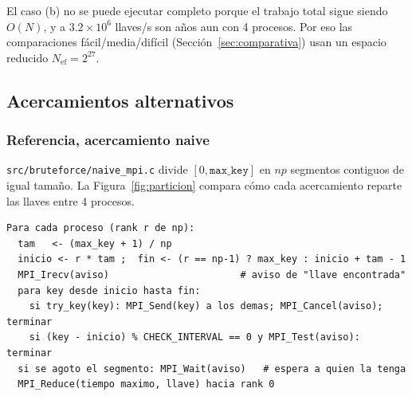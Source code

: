 \documentclass[11pt,letterpaper]{article}
\begin{document}
El caso (b) no se puede ejecutar completo porque el trabajo total sigue siendo
$O(N)$, y a $3.2\times10^{6}$ llaves/s son años aun con 4 procesos. Por eso
las comparaciones fácil/media/difícil (Sección~\ref{sec:comparativa})
usan un espacio reducido $N_{\text{ef}}=2^{27}$.

\subsection{Acercamientos alternativos}

\subsubsection*{Referencia, acercamiento naive}
\texttt{src/bruteforce/naive\_mpi.c} divide $[0, \texttt{max\_key}]$ en
$np$ segmentos contiguos de igual tamaño. La Figura~\ref{fig:particion}
compara cómo cada acercamiento reparte las llaves entre 4 procesos.

\begin{lstlisting}
Para cada proceso (rank r de np):
  tam   <- (max_key + 1) / np
  inicio <- r * tam ;  fin <- (r == np-1) ? max_key : inicio + tam - 1
  MPI_Irecv(aviso)                       # aviso de "llave encontrada"
  para key desde inicio hasta fin:
    si try_key(key): MPI_Send(key) a los demas; MPI_Cancel(aviso); terminar
    si (key - inicio) % CHECK_INTERVAL == 0 y MPI_Test(aviso): terminar
  si se agoto el segmento: MPI_Wait(aviso)   # espera a quien la tenga
  MPI_Reduce(tiempo maximo, llave) hacia rank 0
\end{lstlisting}
\end{document}
